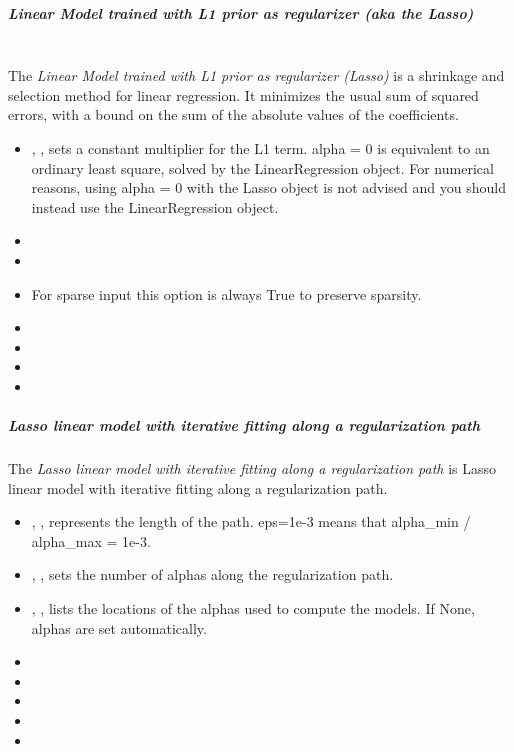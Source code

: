 \subparagraph{Linear Model trained with L1 prior as regularizer (aka the Lasso)}
\mbox{}
\\The \textit{Linear Model trained with L1 prior as regularizer (Lasso)} is a
shrinkage and selection method for linear regression.
%
It minimizes the usual sum of squared errors, with a bound on the sum of the
absolute values of the coefficients.
%
\begin{itemize}
  \item {}, , sets a constant
  multiplier for the L1 term.
  alpha = 0 is equivalent to an ordinary least square, solved by the
  LinearRegression object.
  For numerical reasons, using alpha = 0 with the Lasso object is not advised
  and you should instead use the LinearRegression object.
  \item {}
  \item {}
  \item \precomputeDescription{}
  \nb For sparse input this option is always True to preserve sparsity.
  \item \maxIterDescription{}
  \item {}
  \item \warmStartDescription{}
  \item \positiveDescription{}
\end{itemize}

\subparagraph{Lasso linear model with iterative fitting along a regularization
  path}
\mbox{}

The \textit{Lasso linear model with iterative fitting along a regularization
path} is Lasso linear model with iterative fitting along a regularization
path. 
\begin{itemize}
  \item {}, , represents the length of
  the path.
  eps=1e-3 means that alpha\_min / alpha\_max = 1e-3.
  \item {}, , sets the number of
  alphas along the regularization path.
  \item {}, , lists the
  locations of the alphas used to compute the models.
  If None, alphas are set automatically.
  \item \precomputeDescription{}
  \item \maxIterDescription{}
  \item {}
  \item \verDescriptionB
  \item \positiveDescription{}
\end{itemize}

